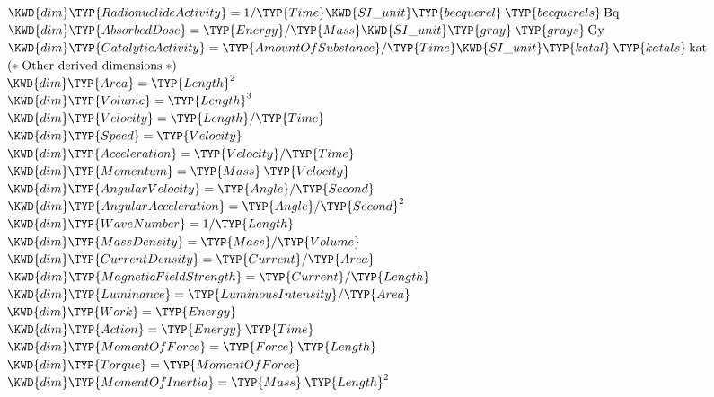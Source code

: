 \begin{Fortress}
\( \KWD{dim} \TYP{RadionuclideActivity} = 1 / \TYP{Time}  \KWD{SI{\char'137}unit} \TYP{becquerel}\mskip 4mu plus 4mu\TYP{becquerels}\mskip 4mu plus 4mu\mathrm{Bq} \)\\
\( \KWD{dim} \TYP{AbsorbedDose} = \TYP{Energy} / \TYP{Mass}  \KWD{SI{\char'137}unit} \TYP{gray}\mskip 4mu plus 4mu\TYP{grays}\mskip 4mu plus 4mu\mathrm{Gy} \)\\
\( \KWD{dim} \TYP{CatalyticActivity} = \TYP{AmountOfSubstance} / \TYP{Time}  \KWD{SI{\char'137}unit} \TYP{katal}\mskip 4mu plus 4mu\TYP{katals}\mskip 4mu plus 4mu\mathrm{kat} \)\\[4pt]
\( \mathtt{(*}\;\hbox{\rm  Other derived dimensions \unskip}\;\mathtt{*)}\)\\[4pt]
\( \KWD{dim} \TYP{Area} = \TYP{Length}^{2}\)\\
\( \KWD{dim} \TYP{Volume} = \TYP{Length}^{3}\)\\
\( \KWD{dim} \TYP{Velocity} = \TYP{Length} / \TYP{Time}\)\\
\( \KWD{dim} \TYP{Speed} = \TYP{Velocity}\)\\
\( \KWD{dim} \TYP{Acceleration} = \TYP{Velocity} / \TYP{Time}\)\\
\( \KWD{dim} \TYP{Momentum} = \TYP{Mass}\mskip 4mu plus 4mu\TYP{Velocity}\)\\
\( \KWD{dim} \TYP{AngularVelocity} = \TYP{Angle} / \TYP{Second}\)\\
\( \KWD{dim} \TYP{AngularAcceleration} = \TYP{Angle} / \TYP{Second}^{2}\)\\
\( \KWD{dim} \TYP{WaveNumber} = 1 / \TYP{Length}\)\\
\( \KWD{dim} \TYP{MassDensity} = \TYP{Mass} / \TYP{Volume}\)\\
\( \KWD{dim} \TYP{CurrentDensity} = \TYP{Current} / \TYP{Area}\)\\
\( \KWD{dim} \TYP{MagneticFieldStrength} = \TYP{Current} / \TYP{Length}\)\\
\( \KWD{dim} \TYP{Luminance} = \TYP{LuminousIntensity} / \TYP{Area}\)\\
\( \KWD{dim} \TYP{Work} = \TYP{Energy}\)\\
\( \KWD{dim} \TYP{Action} = \TYP{Energy}\mskip 4mu plus 4mu\TYP{Time}\)\\
\( \KWD{dim} \TYP{MomentOfForce} = \TYP{Force}\mskip 4mu plus 4mu\TYP{Length}\)\\
\( \KWD{dim} \TYP{Torque} = \TYP{MomentOfForce}\)\\
\( \KWD{dim} \TYP{MomentOfInertia} = \TYP{Mass}\mskip 4mu plus 4mu\TYP{Length}^{2}\)\\

\end{Fortress}
